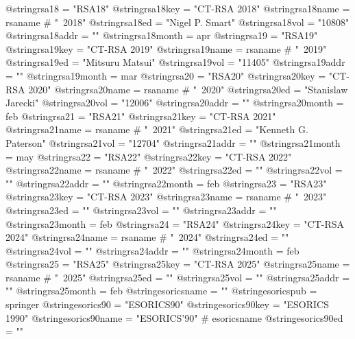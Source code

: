 @string{rsa18 =                 "RSA18"}
@string{rsa18key =              "CT-RSA 2018"}
@string{rsa18name =             rsaname # "~2018"}
@string{rsa18ed =               "Nigel P. Smart"}
@string{rsa18vol =              "10808"}
@string{rsa18addr =             ""}
@string{rsa18month =            apr}
@string{rsa19 =                 "RSA19"}
@string{rsa19key =              "CT-RSA 2019"}
@string{rsa19name =             rsaname # "~2019"}
@string{rsa19ed =               "Mitsuru Matsui"}
@string{rsa19vol =              "11405"}
@string{rsa19addr =             ""}
@string{rsa19month =            mar}
@string{rsa20 =                 "RSA20"}
@string{rsa20key =              "CT-RSA 2020"}
@string{rsa20name =             rsaname # "~2020"}
@string{rsa20ed =               "Stanislaw Jarecki"}
@string{rsa20vol =              "12006"}
@string{rsa20addr =             ""}
@string{rsa20month =            feb}
@string{rsa21 =                 "RSA21"}
@string{rsa21key =              "CT-RSA 2021"}
@string{rsa21name =             rsaname # "~2021"}
@string{rsa21ed =               "Kenneth G. Paterson"}
@string{rsa21vol =              "12704"}
@string{rsa21addr =             ""}
@string{rsa21month =            may}
@string{rsa22 =                 "RSA22"}
@string{rsa22key =              "CT-RSA 2022"}
@string{rsa22name =             rsaname # "~2022"}
@string{rsa22ed =               ""}
@string{rsa22vol =              ""}
@string{rsa22addr =             ""}
@string{rsa22month =            feb}
@string{rsa23 =                 "RSA23"}
@string{rsa23key =              "CT-RSA 2023"}
@string{rsa23name =             rsaname # "~2023"}
@string{rsa23ed =               ""}
@string{rsa23vol =              ""}
@string{rsa23addr =             ""}
@string{rsa23month =            feb}
@string{rsa24 =                 "RSA24"}
@string{rsa24key =              "CT-RSA 2024"}
@string{rsa24name =             rsaname # "~2024"}
@string{rsa24ed =               ""}
@string{rsa24vol =              ""}
@string{rsa24addr =             ""}
@string{rsa24month =            feb}
@string{rsa25 =                 "RSA25"}
@string{rsa25key =              "CT-RSA 2025"}
@string{rsa25name =             rsaname # "~2025"}
@string{rsa25ed =               ""}
@string{rsa25vol =              ""}
@string{rsa25addr =             ""}
@string{rsa25month =            feb}
@string{esoricsname =           ""}
@string{esoricspub =            springer}
@string{esorics90 =             "ESORICS90"}
@string{esorics90key =          "ESORICS 1990"}
@string{esorics90name =         "ESORICS'90" # esoricsname}
@string{esorics90ed =           ""}
